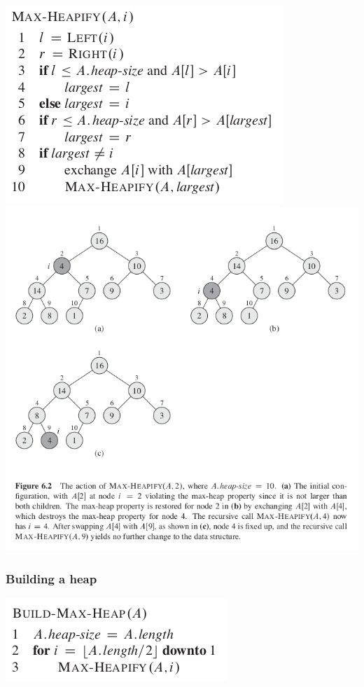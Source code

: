 \documentclass[11pt]{article}
\begin{document}
\includegraphics[width=.9\linewidth]{pics/c6_max_heapify.png} \\

\includegraphics[width=.9\linewidth]{pics/c6_max_heapify_fig.png} \\

\subsubsection{Building a heap}
\label{sec-3-1-3}
\includegraphics[width=.9\linewidth]{pics/c6_build_max_heap.png} \\
\end{document}
